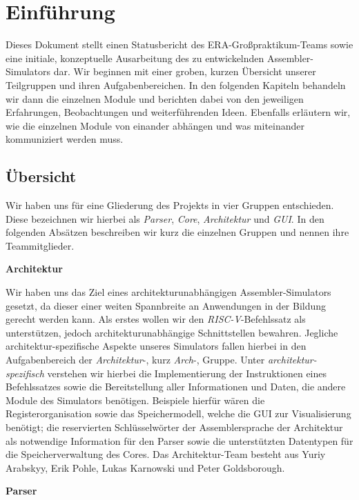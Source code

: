 \chapter{Einführung}

Dieses Dokument stellt einen Statusbericht des ERA-Großpraktikum-Teams sowie
eine initiale, konzeptuelle Ausarbeitung des zu entwickelnden Assembler-
Simulators dar.
Wir beginnen mit einer groben, kurzen Übersicht
unserer Teilgruppen und ihren Aufgabenbereichen.
In den folgenden Kapiteln
behandeln wir dann die einzelnen Module und berichten dabei von den jeweiligen
Erfahrungen, Beobachtungen und weiterführenden Ideen.
Ebenfalls erläutern wir, wie die einzelnen
Module von einander abhängen und was miteinander kommuniziert werden muss.

\section{Übersicht}

Wir haben uns für eine Gliederung des Projekts in vier Gruppen entschieden.
Diese bezeichnen wir hierbei als \emph{Parser}, \emph{Core},
\emph{Architektur} und \emph{GUI}. In den folgenden Absätzen beschreiben wir kurz die
einzelnen Gruppen und nennen ihre Teammitglieder.

\textbf{Architektur}

Wir haben uns das Ziel eines architekturunabhängigen Assembler-Simulators gesetzt,
da dieser einer weiten Spannbreite an Anwendungen in
der Bildung gerecht werden kann. Als erstes wollen wir den \emph{RISC-V}-Befehlssatz
als unterstützen, jedoch architekturunabhängige Schnittstellen bewahren.
Jegliche architektur-spezifische Aspekte
unseres Simulators fallen hierbei in den Aufgabenbereich der
\emph{Architektur}-, kurz \emph{Arch}-, Gruppe. Unter
\emph{architektur-spezifisch} verstehen wir hierbei die Implementierung der
Instruktionen eines Befehlssatzes sowie die Bereitstellung aller Informationen
und Daten, die andere Module des Simulators benötigen. Beispiele hierfür wären
die Registerorganisation sowie das Speichermodell, welche die GUI zur
Visualisierung benötigt; die reservierten Schlüsselwörter der Assemblersprache
der Architektur als notwendige Information für den Parser sowie die
unterstützten Datentypen für die Speicherverwaltung des Cores. Das
Architektur-Team besteht aus Yuriy Arabskyy, Erik Pohle, Lukas Karnowski und
Peter Goldsborough.

\textbf{Parser}

